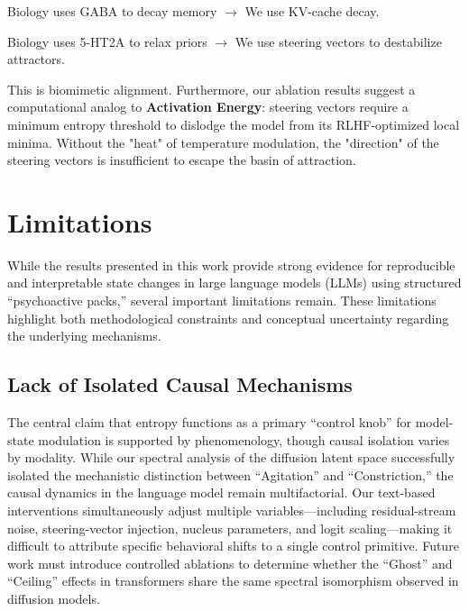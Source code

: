 \documentclass[10pt]{article}
\begin{document}
Biology uses GABA to decay memory $\rightarrow$ We use KV-cache decay.

Biology uses 5-HT2A to relax priors $\rightarrow$ We use steering vectors to destabilize attractors.

This is biomimetic alignment. Furthermore, our ablation results suggest a computational analog to \textbf{Activation Energy}: steering vectors require a minimum entropy threshold to dislodge the model from its RLHF-optimized local minima. Without the "heat" of temperature modulation, the "direction" of the steering vectors is insufficient to escape the basin of attraction.


\section{Limitations}

While the results presented in this work provide strong evidence for reproducible and interpretable state changes in large language models (LLMs) using structured ``psychoactive packs,'' several important limitations remain. These limitations highlight both methodological constraints and conceptual uncertainty regarding the underlying mechanisms.

\subsection{Lack of Isolated Causal Mechanisms}
The central claim that entropy functions as a primary ``control knob'' for model-state modulation is supported by phenomenology, though causal isolation varies by modality. While our spectral analysis of the diffusion latent space successfully isolated the mechanistic distinction between ``Agitation'' and ``Constriction,'' the causal dynamics in the language model remain multifactorial. Our text-based interventions simultaneously adjust multiple variables---including residual-stream noise, steering-vector injection, nucleus parameters, and logit scaling---making it difficult to attribute specific behavioral shifts to a single control primitive. Future work must introduce controlled ablations to determine whether the ``Ghost'' and ``Ceiling'' effects in transformers share the same spectral isomorphism observed in diffusion models.
\end{document}
